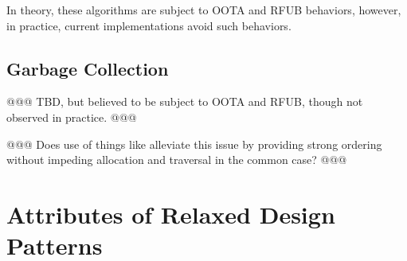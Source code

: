 \documentclass[10]{article}
\begin{document}
In theory, these algorithms are subject to OOTA and RFUB behaviors, however,
in practice, current implementations avoid such behaviors.

\subsection{Garbage Collection}
\label{sec:Garbage Collection}

@@@ TBD, but believed to be subject to OOTA and RFUB, though not
observed in practice. @@@

@@@ Does use of things like  alleviate this issue
by providing strong ordering without impeding allocation and traversal
in the common case?  @@@

\section{Attributes of Relaxed Design Patterns}
\label{sec:Attributes of Relaxed Design Patterns}
\end{document}

